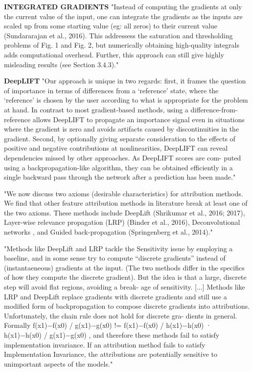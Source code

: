 		\textbf{INTEGRATED GRADIENTS}
			"Instead of computing the gradients at only the current value of the input, one can integrate the gradients as the inputs are scaled up from some starting value (eg: all zeros) to their current value (Sundararajan et al., 2016). This addressess the saturation and thresholding problems of Fig. 1 and Fig. 2, but numerically obtaining high-quality integrals adds computational overhead. Further, this approach can still give highly misleading results (see Section 3.4.3)." \cite{Shrikumar2017}
		
		\textbf{DeepLIFT}
			"Our approach is unique in two regards: first, it frames the question of importance in terms of differences from a ‘reference’ state, where the ‘reference’ is chosen by the user according to what is appropriate for the problem at hand. In contrast to most gradient-based methods, using a difference-from-reference allows DeepLIFT to propagate an importance signal even in situations where the gradient is zero and avoids artifacts caused by discontinuities in the gradient. Second, by optionally giving separate consideration to the effects of positive and negative contributions at nonlinearities, DeepLIFT can reveal dependencies missed by other approaches. As DeepLIFT scores are com- puted using a backpropagation-like algorithm, they can be obtained efficiently in a single backward pass through the network after a prediction has been made." \cite{Shrikumar2017}
			
			"We now discuss two axioms (desirable characteristics) for attribution methods. We find that other feature attribution methods in literature break at least one of the two axioms. These methods include DeepLift (Shrikumar et al., 2016; 2017), Layer-wise relevance propagation (LRP) (Binder et al., 2016), Deconvolutional networks \cite{Zeiler2014}, and Guided back-propagation (Springenberg et al., 2014)." \cite{Sundararajan2017}
			
			"Methods like DeepLift and LRP tackle the Sensitivity issue by employing a baseline, and in some sense try to compute “discrete gradients” instead of (instantaeneous) gradients at the input. (The two methods differ in the specifics of how they compute the discrete gradient). But the idea is that a large, discrete step will avoid flat regions, avoiding a break- age of sensitivity.
			[...]
			Methods like LRP and DeepLift replace gradients with discrete gradients and still use a modified form of backpropagation to compose discrete gradients into attributions. Unfortunately, the chain rule does not hold for discrete gra- dients in general. Formally f(x1)−f(x0) / g(x1)−g(x0) != f(x1)−f(x0) / h(x1)−h(x0) · h(x1)−h(x0) / g(x1)−g(x0) , and therefore these methods fail to satisfy implementation invariance.
			If an attribution method fails to satisfy Implementation Invariance, the attributions are potentially sensitive to unimportant aspects of the models." \cite{Sundararajan2017}
		

